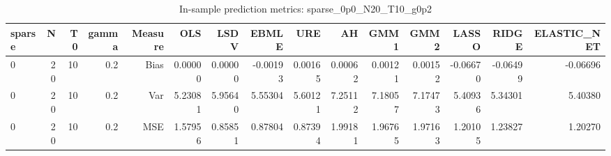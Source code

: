 \begin{table}[!htbp]\centering
\caption{In-sample prediction metrics: sparse_0p0_N20_T10_g0p2}
\label{tab:table2_sparse_0p0_N20_T10_g0p2}
\begin{tabular}{lrrrrrrrrrrrrrr}
\hline
sparse & N & T0 & gamma & Measure & OLS & LSDV & EBMLE & URE & AH & GMM1 & GMM2 & LASSO & RIDGE & ELASTIC_NET \\
\hline
0 & 20 & 10 & 0.2 & Bias & 0.00000 & 0.00000 & -0.00193 & 0.00165 & 0.00062 & 0.00121 & 0.00152 & -0.06670 & -0.06499 & -0.06696 \\
0 & 20 & 10 & 0.2 & Var & 5.23081 & 5.95640 & 5.55304 & 5.60121 & 7.25112 & 7.18057 & 7.17473 & 5.40936 & 5.34301 & 5.40380 \\
0 & 20 & 10 & 0.2 & MSE & 1.57956 & 0.85851 & 0.87804 & 0.87394 & 1.99181 & 1.96765 & 1.97163 & 1.20105 & 1.23827 & 1.20270 \\
\hline
\end{tabular}
\end{table}

